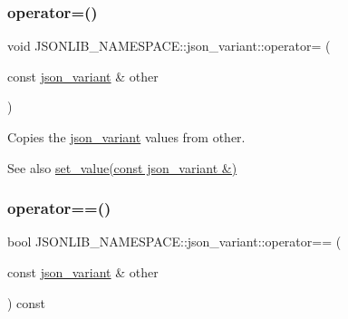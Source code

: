 \subsubsection{\texorpdfstring{operator=()}{operator=()}\hspace{0.1cm}{\footnotesize\ttfamily [2/2]}}
{\footnotesize\ttfamily void J\+S\+O\+N\+L\+I\+B\+\_\+\+N\+A\+M\+E\+S\+P\+A\+C\+E\+::json\+\_\+variant\+::operator= (\begin{DoxyParamCaption}\item[{const \hyperlink{classJSONLIB__NAMESPACE_1_1json__variant}{json\+\_\+variant} \&}]{other }\end{DoxyParamCaption})\hspace{0.3cm}{\ttfamily [inline]}}



Copies the \hyperlink{classJSONLIB__NAMESPACE_1_1json__variant}{json\+\_\+variant} values from {\ttfamily other}. 

\begin{DoxySeeAlso}{See also}
\hyperlink{classJSONLIB__NAMESPACE_1_1json__variant_a75b05acb8473015edd7f21de1656b2b1}{set\+\_\+value(const json\+\_\+variant \&)} 
\end{DoxySeeAlso}
\mbox{\label{classJSONLIB__NAMESPACE_1_1json__variant_aef1fc1a342cc170da06e0d3eb1299aad}} 
\subsubsection{\texorpdfstring{operator==()}{operator==()}\hspace{0.1cm}{\footnotesize\ttfamily [1/2]}}
{\footnotesize\ttfamily bool J\+S\+O\+N\+L\+I\+B\+\_\+\+N\+A\+M\+E\+S\+P\+A\+C\+E\+::json\+\_\+variant\+::operator== (\begin{DoxyParamCaption}\item[{const \hyperlink{classJSONLIB__NAMESPACE_1_1json__variant}{json\+\_\+variant} \&}]{other }\end{DoxyParamCaption}) const\hspace{0.3cm}{\ttfamily [inline]}}



